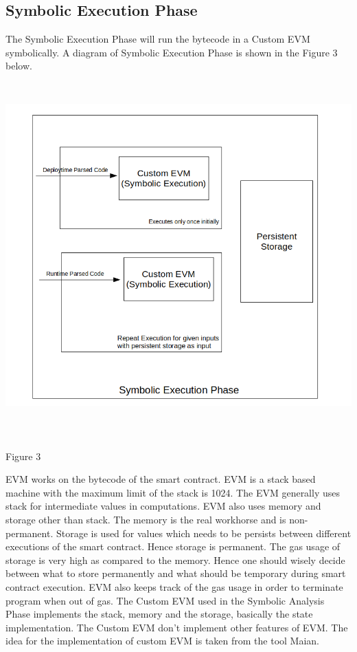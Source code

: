 \subsection{Symbolic Execution Phase}
The Symbolic Execution Phase will run the bytecode in a Custom EVM symbolically. A diagram of Symbolic Execution Phase is shown in the Figure 3 below.\\
\includegraphics[width = 15cm, height = 14cm]{images/3.png}
\begin{center}
    Figure 3
\end{center}
EVM works on the bytecode of the smart contract. EVM is a stack based machine with the maximum limit of the stack is 1024. The EVM generally uses stack for intermediate values in computations. EVM also uses memory and storage other than stack. The memory is the real workhorse and is non-permanent. Storage is used for values which needs to be persists between different executions of the smart contract. Hence storage is permanent. The gas usage of storage is very high as compared to the memory. Hence one should wisely decide between what to store permanently and what should be temporary during smart contract execution. EVM also keeps track of the gas usage in order to terminate program when out of gas. The Custom EVM used in the Symbolic Analysis Phase implements the stack, memory and the storage, basically the state implementation. The Custom EVM don't implement other features of EVM. The idea for the implementation of custom EVM is taken from the tool Maian\cite{10.1145/3274694.3274743}\cite{maian}.\\
